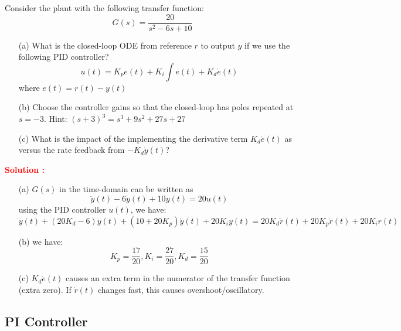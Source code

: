 \documentclass[12pt]{article}
\begin{document}
Consider the plant with the following transfer function:
\begin{equation}
    G(s) = \frac{20}{s^2-6s+10}
\end{equation}
\begin{itemize}
    \item[(a)] What is the closed-loop ODE from reference \(r\) to output \(y\) if we use the following PID controller?
    \[u(t) = K_p e(t) + K_i \int e(t) + K_d \dot{e}(t)\]
    where \(e(t) = r(t) - y(t)\)
    \item[(b)] Choose the controller gains so that the closed-loop has poles repeated at \(s = -3\). Hint: \((s+3)^3 = s^3+9s^2+27s+27\)
    \item[(c)] What is the impact of the implementing the derivative term \(K_d \dot{e}(t)\) as versus the rate feedback from \(-K_d \dot{y}(t)\)?
\end{itemize}
\textbf{\textcolor{red}{Solution :}} 
\begin{itemize}
    \item[(a)] \(G(s)\) in the time-domain can be written as
    \[\ddot{y}(t) - 6\dot{y}(t) + 10 y(t) = 20 u(t)\]
    using the PID controller \(u(t)\), we have:
    \[\dddot{y}(t) + (20 K_d-6)\ddot{y}(t) + (10 + 20 K_p)\dot{y}(t) + 20 K_i y(t) = 20 K_d \ddot{r}(t) + 20 K_p \dot{r}(t) + 20 K_i r(t)\]
    \item[(b)]
    we have:
    \[K_p =\frac{17}{20}, K_i = \frac{27}{20}, K_d = \frac{15}{20}\]
    \item[(c)] \(K_d \dot{e}(t)\) causes an extra term in the numerator of the transfer function (extra zero). If \(\dot{r}(t)\) changes fast, this causes overshoot/oscillatory.
\end{itemize}
\clearpage

\subsection{PI Controller}
\end{document}
